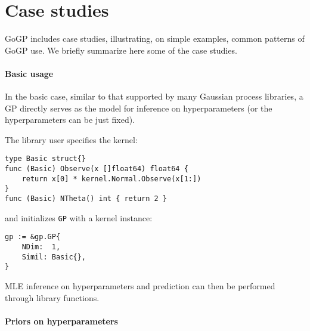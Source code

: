 \documentclass[sigplan,review]{acmart}\settopmatter{printfolios=true,printccs=false,printacmref=false}
\begin{document}
% 

\section{Case studies}

GoGP includes case studies, illustrating, on simple examples,
common patterns of GoGP use. We briefly summarize here some
of the case studies.

\paragraph{Basic usage}

In the basic case, similar to that supported by many Gaussian
process libraries, a GP directly serves as the model for
inference on hyperparameters (or the hyperparameters can be just
fixed).

The library user specifies the kernel:
\begin{lstlisting}
type Basic struct{}
func (Basic) Observe(x []float64) float64 {
    return x[0] * kernel.Normal.Observe(x[1:])
}
func (Basic) NTheta() int { return 2 }
\end{lstlisting}
and initializes \lstinline{GP} with a kernel instance:
\begin{lstlisting}
gp := &gp.GP{
    NDim:  1,
    Simil: Basic{},
}
\end{lstlisting}

MLE inference on hyperparameters and prediction can then be performed
through library functions.

\paragraph{Priors on hyperparameters}
\end{document}
